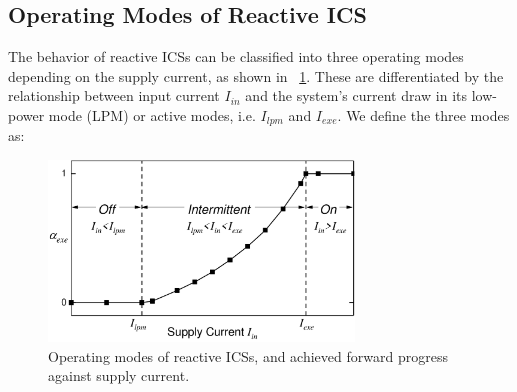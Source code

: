 \subsection{Operating Modes of Reactive ICS}

The behavior of reactive ICSs can be classified into three operating modes depending on the supply current, as shown in \figurename{~\ref{fig:operatingModes}}. These are differentiated by the relationship between input current $I_{in}$ and the system's current draw in its low-power mode (LPM) or active modes, i.e. $I_{lpm}$ and $I_{exe}$. We define the three modes as:

\begin{figure}[!t]
  \centering
  \includegraphics[width=3.2in]{ch3_sizingeffect/figures/OperatingMode0Fig}
  \caption{Operating modes of reactive ICSs, and achieved forward progress against supply current.}
  \label{fig:operatingModes}
\end{figure}

